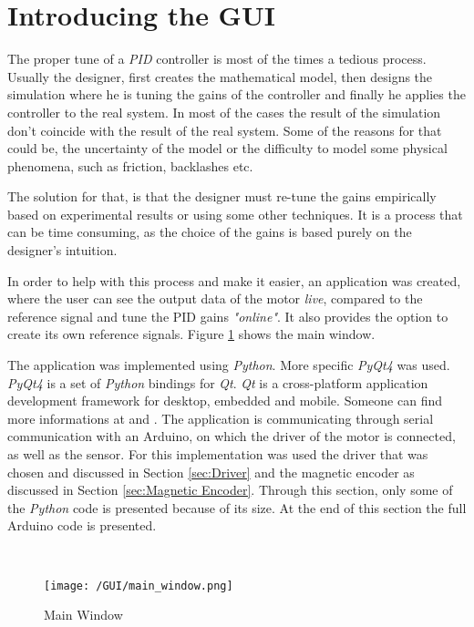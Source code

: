 


\section{Introducing the GUI}

The proper tune of a \textit{PID} controller is most of the times a tedious process. Usually the designer, first creates the mathematical model, then designs the simulation where he is tuning the gains of the controller and finally he applies the controller to the real system. In most of the cases the result of the simulation don't coincide with the result of the real system. Some of the reasons for that could be, the uncertainty of the model or the difficulty to model some physical phenomena, such as friction, backlashes etc. 

The solution for that, is that the designer must re-tune the gains empirically based on experimental results or using some other techniques. It is a process that can be time consuming, as the choice of the gains is based purely on the designer's intuition.

In order to help with this process and make it easier, an application was created, where the user can see the output data of the motor \textit{live}, compared to the reference signal and tune the PID gains \textit{"online"}. It also provides the option to create its own reference signals. Figure \ref{fig:main_window} shows the main window.

The application was implemented using \textit{Python}. More specific \textit{PyQt4} was used. \textit{PyQt4} is a set of \textit{Python} bindings for \textit{Qt}. \textit{Qt} is a cross-platform application development framework for desktop, embedded and mobile. Someone can find more informations at \cite{Qt} and \cite{PyQt}. The application is communicating through serial communication with an Arduino, on which the driver of the motor is connected, as well as the sensor. For this implementation was used the driver that was chosen and discussed in Section \ref{sec:Driver} and the magnetic encoder as discussed in Section \ref{sec:Magnetic Encoder}. Through this section, only some of the \textit{Python} code is presented because of its size. At the end of this section the full Arduino code is presented.

\

\begin{figure}[b!]
	\centering
		\texttt{[image: /GUI/main\_window.png]}
		\caption{Main Window}
		\label{fig:main_window}
\end{figure}

